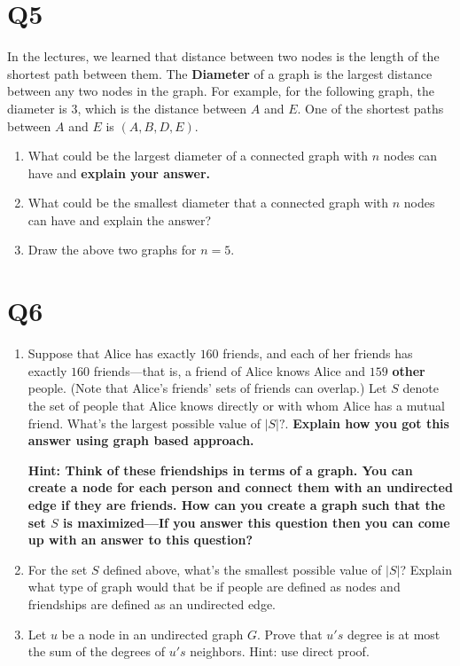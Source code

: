 \documentclass[12pt]{exam}
\begin{document}
\section{Q5} 
In the lectures, we learned that distance between two nodes is the length of the shortest path between them. The \textbf{Diameter} of a graph is the largest distance between any two nodes in the graph. For example, for the following graph, the diameter is $3$, which is the distance between $A$ and $E$. One of the shortest paths between $A$ and $E$ is $(A, B, D, E)$.


\begin{enumerate}
    \item What could be the largest diameter of a connected graph with $n$ nodes can have and \textbf{explain your answer.}
    \item What could be the smallest diameter that a connected graph with $n$ nodes can have and explain the answer?
    \item Draw the above two graphs for $n = 5$.
\end{enumerate}



\section{Q6}
\begin{enumerate}
    \item Suppose that Alice has exactly $160$ friends, and each of her friends has exactly $160$ friends---that is, a friend of Alice knows Alice and $159$ \textbf{other} people. (Note that Alice’s friends’ sets of friends can overlap.) Let $S$ denote the set of people that Alice knows directly or with whom Alice has a mutual friend. What’s the largest possible value of $|S|?$. \textbf{Explain how you got this answer using graph based approach.}
    
    \textbf{Hint: Think of these friendships in terms of a graph. You can create a node for each person and connect them with an undirected edge if they are friends. How can you create a graph such that the set $S$ is maximized---If you answer this question then you can come up with an answer to this question?}
    \item For the set $S$ defined above, what’s the smallest possible value of $|S|$? Explain what type of graph would that be if people are defined as nodes and friendships are defined as an undirected edge.
    \item Let $u$ be a node in an undirected graph $G$. Prove that $u's$ degree is at most the sum of the degrees of $u's$ neighbors. Hint: use direct proof.
\end{enumerate}
\end{document}
